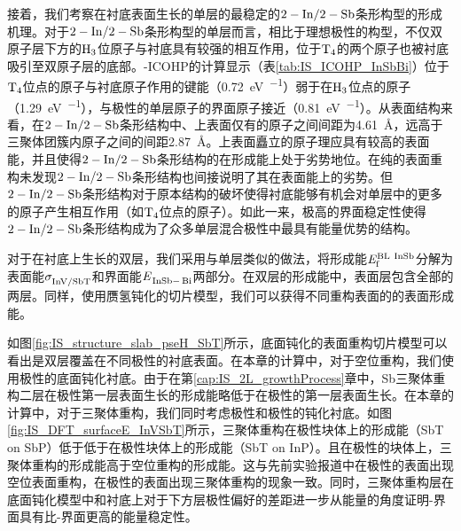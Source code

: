 接着，我们考察在衬底表面生长的单层的最稳定的$\rm 2-In/2-Sb$条形构型的形成机理。对于$\rm 2-In/2-Sb$条形构型的单层而言，相比于理想极性的构型，不仅双原子层下方的$\rm H_{3} \it$位原子与衬底具有较强的相互作用，位于$\rm T_{4} \it$的两个原子也被衬底吸引至双原子层的底部。-ICOHP的计算显示（表\ref{tab:IS_ICOHP_InSbBi}）位于$\rm T_{4} \it$位点的原子与衬底原子作用的键能（\SI{0.72}{\electronvolt\per\pair}）弱于在$\rm H_{3} \it$位点的原子（\SI{1.29}{\electronvolt\per\pair}），与极性的单层原子的界面原子接近（\SI{0.81}{\electronvolt\per\pair}）。从表面结构来看，在$\rm 2-In/2-Sb$条形结构中、上表面仅有的原子之间间距为\SI{4.61}{\angstrom}，远高于三聚体团簇内原子之间的间距\SI{2.87}{\angstrom}。上表面矗立的原子理应具有较高的表面能，并且使得$\rm 2-In/2-Sb$条形结构的在形成能上处于劣势地位。在纯的表面重构未发现$\rm 2-In/2-Sb$条形结构也间接说明了其在表面能上的劣势。但$\rm 2-In/2-Sb$条形结构对于原本结构的破坏使得衬底能够有机会对单层中的更多的原子产生相互作用（如$\rm T_{4} \it$位点的原子）。如此一来，极高的界面稳定性使得$\rm 2-In/2-Sb$条形结构成为了众多单层混合极性中最具有能量优势的结构。


对于在衬底上生长的双层，我们采用与单层类似的做法，将形成能$\it E_{\rm f}^{\rm BL\ InSb} \it$分解为表面能$\it \sigma_{\rm InV/ SbT}^{\rm } \it$和界面能$\energyVar{\cemb{InSb}-\cemb{Bi}}{}$两部分。在双层的形成能中，表面层包含全部的两层。同样，使用赝氢钝化的切片模型，我们可以获得不同重构表面的的表面形成能。

如图\ref{fig:IS_structure_slab_pseH_SbT}所示，底面钝化的表面重构切片模型可以看出是双层覆盖在不同极性的衬底表面。在本章的计算中，对于空位重构，我们使用极性的底面钝化衬底。由于在第\ref{cap:IS_2L_growthProcess}章中，{Sb}三聚体重构二层在极性第一层表面生长的形成能略低于在极性的第一层表面生长。在本章的计算中，对于三聚体重构，我们同时考虑极性和极性的钝化衬底。如图\ref{fig:IS_DFT_surfaceE_InVSbT}所示，三聚体重构在极性块体上的形成能（SbT on SbP）低于低于在极性块体上的形成能（SbT on InP）。且在极性的块体上，三聚体重构的形成能高于空位重构的形成能。这与先前实验报道中在极性的表面出现空位表面重构，在极性的表面出现三聚体重构的现象一致。同时，三聚体重构层在底面钝化模型中和衬底上对于下方层极性偏好的差距进一步从能量的角度证明-界面具有比-界面更高的能量稳定性。

